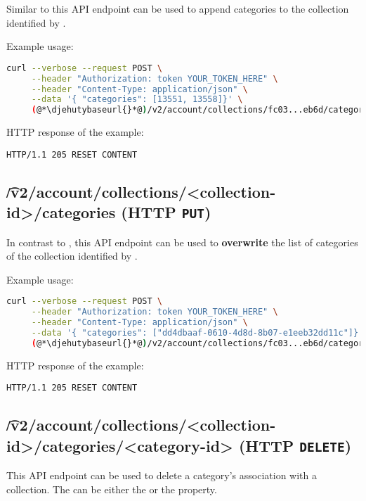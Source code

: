   Similar to  this API endpoint can be
  used to append categories to the collection identified by .

  Example usage:
\begin{lstlisting}[language=bash]
curl --verbose --request POST \
     --header "Authorization: token YOUR_TOKEN_HERE" \
     --header "Content-Type: application/json" \
     --data '{ "categories": [13551, 13558]}' \
     (@*\djehutybaseurl{}*@)/v2/account/collections/fc03...eb6d/categories
\end{lstlisting}

  HTTP response of the example:
\begin{lstlisting}
HTTP/1.1 205 RESET CONTENT
\end{lstlisting}

\subsection{\t{/v2/account/collections/<collection-id>/categories} (HTTP \texttt{PUT})}

  In contrast to , this API endpoint
  can be used to \textbf{overwrite} the list of categories of the collection identified
  by \code{collection-id}.

  Example usage:
\begin{lstlisting}[language=bash]
curl --verbose --request POST \
     --header "Authorization: token YOUR_TOKEN_HERE" \
     --header "Content-Type: application/json" \
     --data '{ "categories": ["dd4dbaaf-0610-4d8d-8b07-e1eeb32dd11c"]}' \
     (@*\djehutybaseurl{}*@)/v2/account/collections/fc03...eb6d/categories
\end{lstlisting}

  HTTP response of the example:
\begin{lstlisting}
HTTP/1.1 205 RESET CONTENT
\end{lstlisting}

\subsection{\t{/v2/account/collections/<collection-id>/categories/<category-id>} (HTTP \texttt{DELETE})}

  This API endpoint can be used to delete a category's association with a collection.
  The \code{category-id} can be either the  or the  property.

